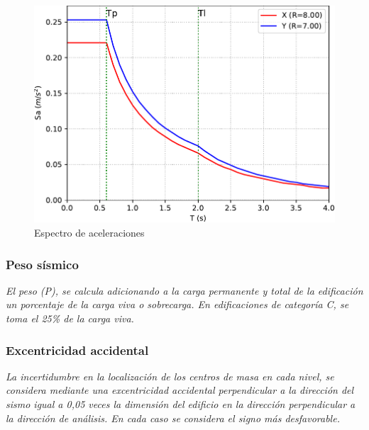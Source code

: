\documentclass{article}%
\begin{document}
\begin{figure}[H]%
\includegraphics[width=\textwidth]{images/espectro_respuestas}%
\caption{Espectro de aceleraciones}%
\end{figure}

%
\subsubsection{Peso sísmico}%
\label{ssubsec:Pesossmico}%
\begin{tcolorbox}[colback=gray!5!white,colframe=Maroon!75!black,fonttitle=\bfseries,title=Art. 26]%
\textit{El peso (P), se calcula adicionando a la carga permanente y total de la edificación un porcentaje de la carga viva o sobrecarga. En edificaciones de categoría C, se toma el 25\% de la carga viva.}%
\end{tcolorbox}%

%
\subsubsection{Excentricidad accidental}%
\label{ssubsec:Excentricidadaccidental}%
\begin{tcolorbox}[colback=gray!5!white,colframe=Maroon!75!black,fonttitle=\bfseries,title=Art. 28.5]%
\textit{La incertidumbre en la localización de los centros de masa en cada nivel, se considera mediante una excentricidad accidental perpendicular a la dirección del sismo igual a 0,05 veces la dimensión del edificio en la dirección perpendicular a la dirección de análisis. En cada caso se considera el signo más desfavorable.}%
\end{tcolorbox}%
\end{document}
